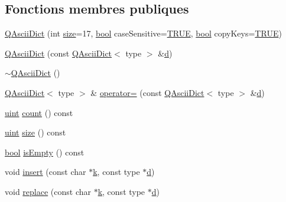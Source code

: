 \subsection*{Fonctions membres publiques}
\begin{DoxyCompactItemize}
\item 
\hyperlink{class_q_ascii_dict_a45f3a7163f016feff94ec40fc2d16556}{Q\+Ascii\+Dict} (int \hyperlink{class_q_ascii_dict_a3c94a0697a2d65b80a6cd2a6a5963db4}{size}=17, \hyperlink{qglobal_8h_a1062901a7428fdd9c7f180f5e01ea056}{bool} case\+Sensitive=\hyperlink{qglobal_8h_a04a6422a52070f0dc478693da640242b}{T\+R\+U\+E}, \hyperlink{qglobal_8h_a1062901a7428fdd9c7f180f5e01ea056}{bool} copy\+Keys=\hyperlink{qglobal_8h_a04a6422a52070f0dc478693da640242b}{T\+R\+U\+E})
\item 
\hyperlink{class_q_ascii_dict_a78f2d7f76559477666281122c28cb3a3}{Q\+Ascii\+Dict} (const \hyperlink{class_q_ascii_dict}{Q\+Ascii\+Dict}$<$ type $>$ \&\hyperlink{060__command__switch_8tcl_af43f4b1f0064a33b2d662af9f06d3a00}{d})
\item 
\hyperlink{class_q_ascii_dict_a2deeec9405335a1dfe5ffc233507acc0}{$\sim$\+Q\+Ascii\+Dict} ()
\item 
\hyperlink{class_q_ascii_dict}{Q\+Ascii\+Dict}$<$ type $>$ \& \hyperlink{class_q_ascii_dict_a70f70bfeacefca74f3e4c1f50eb48a16}{operator=} (const \hyperlink{class_q_ascii_dict}{Q\+Ascii\+Dict}$<$ type $>$ \&\hyperlink{060__command__switch_8tcl_af43f4b1f0064a33b2d662af9f06d3a00}{d})
\item 
\hyperlink{qglobal_8h_a4d3943ddea65db7163a58e6c7e8df95a}{uint} \hyperlink{class_q_ascii_dict_a94b6435bf7cd63fc0de41e2bfa21dffc}{count} () const 
\item 
\hyperlink{qglobal_8h_a4d3943ddea65db7163a58e6c7e8df95a}{uint} \hyperlink{class_q_ascii_dict_a3c94a0697a2d65b80a6cd2a6a5963db4}{size} () const 
\item 
\hyperlink{qglobal_8h_a1062901a7428fdd9c7f180f5e01ea056}{bool} \hyperlink{class_q_ascii_dict_aaf9ae99b13fe68a23e017cca6f5f971a}{is\+Empty} () const 
\item 
void \hyperlink{class_q_ascii_dict_acc5f4b40410413caaa443c0fc3207642}{insert} (const char $\ast$\hyperlink{060__command__switch_8tcl_a20363f854eb4098a446733d63d34dbc1}{k}, const type $\ast$\hyperlink{060__command__switch_8tcl_af43f4b1f0064a33b2d662af9f06d3a00}{d})
\item 
void \hyperlink{class_q_ascii_dict_a96d9b7c85141e7215bad0d371a347a40}{replace} (const char $\ast$\hyperlink{060__command__switch_8tcl_a20363f854eb4098a446733d63d34dbc1}{k}, const type $\ast$\hyperlink{060__command__switch_8tcl_af43f4b1f0064a33b2d662af9f06d3a00}{d})

\end{DoxyCompactItemize}
